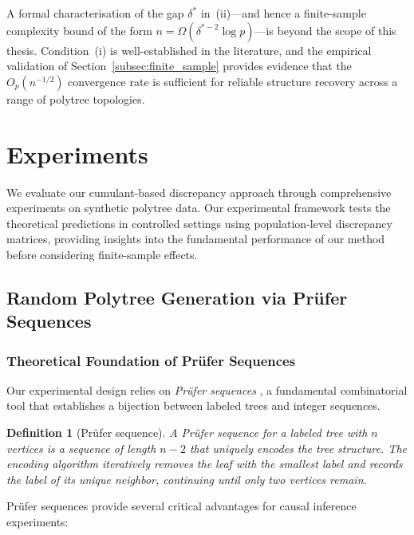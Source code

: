 \documentclass[11pt,a4paper]{article}
\numberwithin{equation}{section}
\newtheorem{definition}[theorem]{Definition}
\begin{document}
A formal characterisation of the gap $\delta^*$ in~(ii)—and hence a
finite-sample complexity bound of the form $n=\Omega(\delta^{*-2}\log p)$—is
beyond the scope of this thesis.  Condition~(i) is well-established in the
literature, and the empirical validation of Section~\ref{subsec:finite_sample}
provides evidence that the $O_p(n^{-1/2})$ convergence rate is sufficient for
reliable structure recovery across a range of polytree topologies.

\section{Experiments}
\label{sec:experiments}

We evaluate our cumulant-based discrepancy approach through comprehensive experiments on synthetic polytree data. Our experimental framework tests the theoretical predictions in controlled settings using population-level discrepancy matrices, providing insights into the fundamental performance of our method before considering finite-sample effects.

\subsection{Random Polytree Generation via Prüfer Sequences}

\subsubsection{Theoretical Foundation of Prüfer Sequences}

Our experimental design relies on \emph{Prüfer sequences} \citep{prufer}, a fundamental combinatorial tool that establishes a bijection between labeled trees and integer sequences.

\begin{definition}[Prüfer sequence]
A Prüfer sequence for a labeled tree with $n$ vertices is a sequence of length $n-2$ that uniquely encodes the tree structure. The encoding algorithm iteratively removes the leaf with the smallest label and records the label of its unique neighbor, continuing until only two vertices remain.
\end{definition}

Prüfer sequences provide several critical advantages for causal inference experiments:
\end{document}
